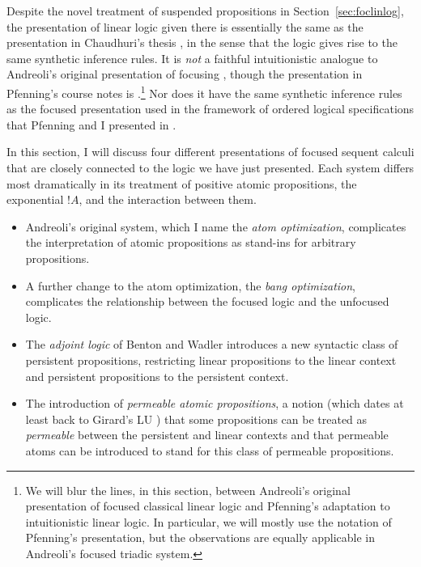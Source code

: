Despite the novel treatment of suspended propositions in
Section~\ref{sec:foclinlog}, the presentation of linear logic given
there is essentially the same as the presentation in Chaudhuri's
thesis \cite{chaudhuri06focused}, in the sense that the logic gives
rise to the same synthetic inference rules. It is {\it not} a faithful
intuitionistic analogue to Andreoli's original presentation of focusing
\cite{andreoli92logic}, though the presentation in Pfenning's course notes is
\cite{pfenning12chaining}.\footnote{We will blur the lines, in this
  section, between Andreoli's original presentation of focused
  classical linear logic and Pfenning's adaptation to intuitionistic
  linear logic. In particular, we will mostly use the notation of
  Pfenning's presentation, but the observations are equally applicable
  in Andreoli's focused triadic system.}  Nor does it have the same
synthetic inference rules as the focused presentation used in the
framework of ordered logical specifications that Pfenning and I
presented in \cite{pfenning09substructural}.

In this section, I will discuss four different presentations of 
focused sequent calculi that are closely connected to the logic we
have just presented. Each system differs most dramatically in its
treatment of positive atomic propositions, the exponential 
${!}A$, and the interaction between them.
\begin{itemize}
\item Andreoli's original system, which I name the {\it atom
    optimization}, complicates the interpretation of atomic
  propositions as stand-ins for arbitrary propositions.
\item A further change to the atom optimization, the {\it bang
    optimization}, complicates the relationship between the focused
  logic and the unfocused logic.
\item The {\it adjoint logic} of Benton and Wadler
  \cite{benton96linear} introduces a new syntactic class of persistent
  propositions, restricting linear propositions to the linear 
  context and persistent propositions to the persistent context.
\item The introduction of {\it permeable atomic propositions}, a
  notion (which dates at least back to Girard's LU
  \cite{girard93unity}) that some propositions can be treated as {\it
    permeable} between the persistent and linear contexts and that
  permeable atoms can be introduced to stand for this class of 
  permeable propositions.
\end{itemize}

